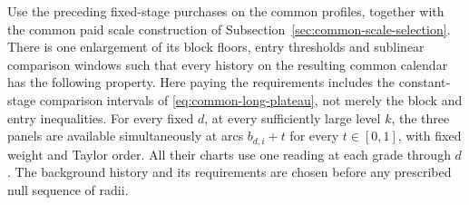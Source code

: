 \begin{proposition}
\label{prop:trace-joint-chart-purchase}
Use the preceding fixed-stage purchases on the common profiles, together with
the common paid scale construction of
Subsection~\ref{sec:common-scale-selection}. There is one enlargement of its
block floors, entry thresholds and sublinear comparison windows such that
every history on the resulting common calendar has the following property.
Here paying the requirements includes the constant-stage comparison
intervals of \eqref{eq:common-long-plateau}, not merely the block and
entry inequalities.
For every fixed $d$, at every sufficiently large level $k$, the three
panels are available simultaneously at arcs $b_{d,i}+t$ for every
$t\in[0,1]$, with fixed weight and Taylor order. All their charts use
one reading at each grade through $d$. The background history and its
requirements are chosen before any prescribed null sequence of radii.
\end{proposition}

